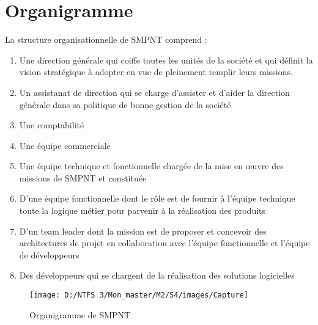 \section{Organigramme}
La structure organisationnelle de SMPNT comprend :
\begin{enumerate}
	\item Une direction générale qui coiffe toutes les unités de la société et qui définit la vision stratégique à adopter en vue de pleinement remplir leurs missions.
	\item Un assistanat de direction qui se charge d’assister et d’aider la direction générale dans sa politique de bonne gestion de la société
	\item Une comptabilité
	\item Une équipe commerciale
	\item Une équipe technique et fonctionnelle chargée de la mise en œuvre des missions de SMPNT et constituée
	\item D’une équipe fonctionnelle dont le rôle est de fournir à l'équipe technique toute la logique métier pour parvenir à la réalisation des produits
	\item D’un team leader dont la mission est de proposer et concevoir des architectures de projet en collaboration avec l'équipe fonctionnelle et l'équipe de développeurs
	\item Des développeurs qui se chargent de la réalisation des solutions logicielles
\end{enumerate}
\begin{figure}[h]
	\texttt{[image: D:/NTFS 3/Mon\_master/M2/S4/images/Capture]}
	\centering
	\caption{Organigramme de SMPNT}
\end{figure}
